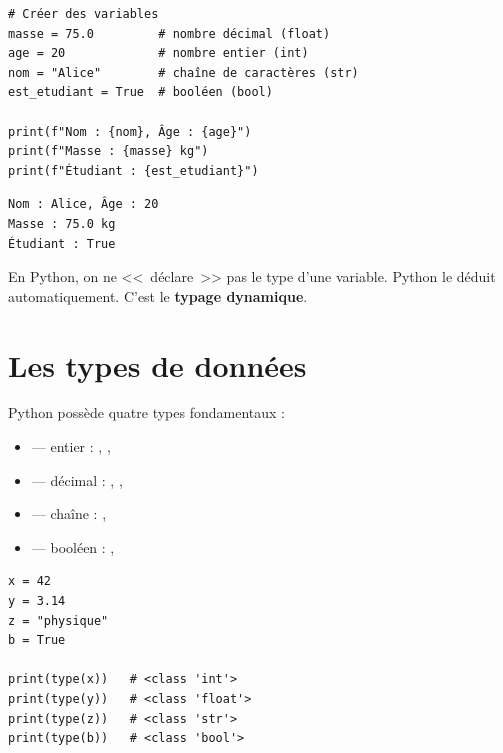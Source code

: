 \begin{codeblock}[title=\textbf{Python --- Cr\'eer des variables}]
\begin{verbatim}
# Créer des variables
masse = 75.0         # nombre décimal (float)
age = 20             # nombre entier (int)
nom = "Alice"        # chaîne de caractères (str)
est_etudiant = True  # booléen (bool)

print(f"Nom : {nom}, Âge : {age}")
print(f"Masse : {masse} kg")
print(f"Étudiant : {est_etudiant}")
\end{verbatim}
\end{codeblock}

\begin{codeoutput}
\begin{verbatim}
Nom : Alice, Âge : 20
Masse : 75.0 kg
Étudiant : True
\end{verbatim}
\end{codeoutput}

\begin{attention}
En Python, on ne <<~d\'eclare~>> pas le type d'une variable. Python le d\'eduit automatiquement. C'est le \textbf{typage dynamique}.
\end{attention}

\section{Les types de donn\'ees}

\begin{definition}
Python poss\`ede quatre types fondamentaux :
\begin{itemize}
\item {} --- entier : , , 
\item {} --- d\'ecimal : , , 
\item {} --- cha\^ine : , 
\item {} --- bool\'een : , 
\end{itemize}
\end{definition}

\begin{codeblock}[title=\textbf{Python --- V\'erifier le type}]
\begin{verbatim}
x = 42
y = 3.14
z = "physique"
b = True

print(type(x))   # <class 'int'>
print(type(y))   # <class 'float'>
print(type(z))   # <class 'str'>
print(type(b))   # <class 'bool'>
\end{verbatim}
\end{codeblock}

